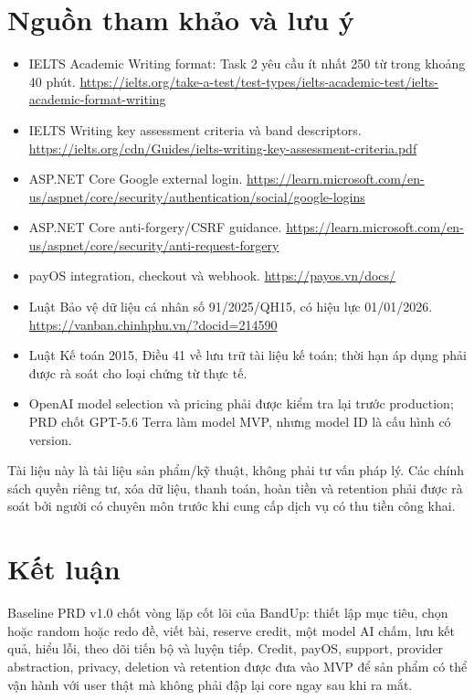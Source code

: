 \documentclass[11pt,a4paper]{article}
\begin{document}
\section{Nguồn tham khảo và lưu ý}
\begin{itemize}
  \item IELTS Academic Writing format: Task 2 yêu cầu ít nhất 250 từ trong khoảng 40 phút. \url{https://ielts.org/take-a-test/test-types/ielts-academic-test/ielts-academic-format-writing}
  \item IELTS Writing key assessment criteria và band descriptors. \url{https://ielts.org/cdn/Guides/ielts-writing-key-assessment-criteria.pdf}
  \item ASP.NET Core Google external login. \url{https://learn.microsoft.com/en-us/aspnet/core/security/authentication/social/google-logins}
  \item ASP.NET Core anti-forgery/CSRF guidance. \url{https://learn.microsoft.com/en-us/aspnet/core/security/anti-request-forgery}
  \item payOS integration, checkout và webhook. \url{https://payos.vn/docs/}
  \item Luật Bảo vệ dữ liệu cá nhân số 91/2025/QH15, có hiệu lực 01/01/2026. \url{https://vanban.chinhphu.vn/?docid=214590}
  \item Luật Kế toán 2015, Điều 41 về lưu trữ tài liệu kế toán; thời hạn áp dụng phải được rà soát cho loại chứng từ thực tế.
  \item OpenAI model selection và pricing phải được kiểm tra lại trước production; PRD chốt GPT-5.6 Terra làm model MVP, nhưng model ID là cấu hình có version.
\end{itemize}
\begin{importantbox}
Tài liệu này là tài liệu sản phẩm/kỹ thuật, không phải tư vấn pháp lý. Các chính sách quyền riêng tư, xóa dữ liệu, thanh toán, hoàn tiền và retention phải được rà soát bởi người có chuyên môn trước khi cung cấp dịch vụ có thu tiền công khai.
\end{importantbox}
\section*{Kết luận}
Baseline PRD v1.0 chốt vòng lặp cốt lõi của BandUp: thiết lập mục tiêu, chọn hoặc random hoặc redo đề, viết bài, reserve credit, một model AI chấm, lưu kết quả, hiểu lỗi, theo dõi tiến bộ và luyện tiếp. Credit, payOS, support, provider abstraction, privacy, deletion và retention được đưa vào MVP để sản phẩm có thể vận hành với user thật mà không phải đập lại core ngay sau khi ra mắt.
\end{document}
